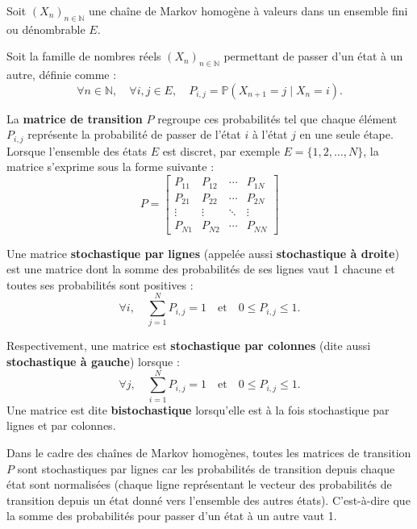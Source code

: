\documentclass{article}
\begin{document}
\begin{tcolorbox}[colback=white,colframe=red!80!black,title=Matrice de Transition]
Soit $(X_n)_{n \in \mathbb{N}}$ une chaîne de Markov homogène à valeurs dans un ensemble fini ou dénombrable $E$.

Soit la famille de nombres réels $(X_n)_{n \in \mathbb{N}}$ permettant de passer d'un état à un autre, définie comme :
\[
\forall n \in \mathbb{N}, \quad \forall i,j \in E, \quad P_{i,j} = \mathbb{P}(X_{n+1} = j \mid X_n = i).
\]

La \textbf{matrice de transition} $P$ regroupe ces probabilités tel que chaque élément $P_{i,j}$ représente la probabilité de passer de l'état $i$ à l'état $j$ en une seule étape.
Lorsque l'ensemble des états $E$ est discret, par exemple $E = \{1, 2, \dots, N\}$, la matrice s'exprime sous la forme suivante :
\[
    P = \begin{bmatrix}
        P_{11} & P_{12} & \cdots & P_{1N}\\[1mm]
        P_{21} & P_{22} & \cdots & P_{2N}\\[1mm]
        \vdots & \vdots & \ddots & \vdots\\[1mm]
        P_{N1} & P_{N2} & \cdots & P_{NN}
    \end{bmatrix}
\]
\end{tcolorbox}

\begin{tcolorbox}[colback=white,colframe=blue!80!black,title=Matrice stochastique par lignes/colonnes]
Une matrice \textbf{stochastique par lignes} (appelée aussi \textbf{stochastique à droite}) est une matrice dont la somme des probabilités de ses lignes vaut 1 chacune et toutes ses probabilités sont positives :
\[
\forall i, \quad \sum_{j=1}^{N} P_{i,j} = 1 \quad \text{et} \quad 0 \leq P_{i,j} \leq 1.
\]

Respectivement, une matrice est \textbf{stochastique par colonnes} (dite aussi \textbf{stochastique à gauche}) lorsque :
\[
\forall j, \quad \sum_{i=1}^{N} P_{i,j} = 1 \quad \text{et} \quad 0 \leq P_{i,j} \leq 1.
\]
Une matrice est dite \textbf{bistochastique} lorsqu'elle est à la fois stochastique par lignes et par colonnes.
\end{tcolorbox}

Dans le cadre des chaînes de Markov homogènes, toutes les matrices de transition $P$ sont stochastiques par lignes car les probabilités de transition depuis chaque état sont normalisées (chaque ligne représentant le vecteur des probabilités de transition depuis un état donné vers l'ensemble des autres états). C'est-à-dire que la somme des probabilités pour passer d'un état à un autre vaut 1. \\
\end{document}
